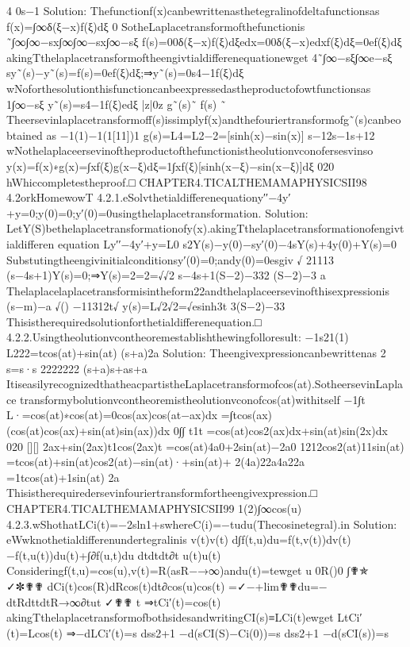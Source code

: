 {4
0s−1
Solution:
Thefunctionf(x)canbewrittenasthetegralinofdeltafunctionsas
f(x)=∫∞δ(ξ−x)f(ξ)dξ
0
SotheLaplacetransformofthefunctionis
˜∫∞{∫∞}−sx∫∞{∫∞−sx}∫∞−sξ
f(s)=00δ(ξ−x)f(ξ)dξedx=00δ(ξ−x)edxf(ξ)dξ=0ef(ξ)dξ
akingTthelaplacetransformoftheengivtialdifferenequationewget
4˜∫∞−sξ∫∞e−sξ
sy˜(s)−y˜(s)=f(s)=0ef(ξ)dξ;⇒y˜(s)=0s4−1f(ξ)dξ
wNoforthesolutionthisfunctioncanbeexpressedastheproductofowtfunctionsas
1∫∞−sξ
y˜(s)=s4−1f(ξ)edξ
|{z}|0{z}
g˜(s)˜
f(s)
˜
Theersevinlaplacetransformoff(s)issimplyf(x)andthefouriertransformofg˜(s)canbeobtained
as
−1(1)−1(1[11])1
g(s)=L4=L2−2=[sinh(x)−sin(x)]
s−12s−1s+12
wNothelaplaceersevinoftheproductofthefunctionistheolutionvconofersesvinso
y(x)=f(x)∗g(x)=∫xf(ξ)g(x−ξ)dξ=1∫xf(ξ)[sinh(x−ξ)−sin(x−ξ)]dξ
020
hWhiccompletestheproof.□
CHAPTER4.TICALTHEMAMAPHYSICSII98
4.2orkHomewowT
4.2.1.eSolvthetialdifferenequationy′′−4y′+y=0;y(0)=0;y′(0)=0usingthelaplacetransformation.
Solution:
LetY(S)bethelaplacetransformationofy(x).akingTthelaplacetransformationofengivtialdifferen
equation
L{y′′−4y′+y}=L{0}
s2Y(s)−y(0)−sy′(0)−4sY(s)+4y(0)+Y(s)=0
Substutingtheengivinitialconditionsy′(0)=0;andy(0)=0esgiv
√
21113
(s−4s+1)Y(s)=0;⇒Y(s)=2=2=√√2
s−4s+1(S−2)−332
(S−2)−3
a
Thelaplacelaplacetransformisintheform22andthelaplaceersevinofthisexpressionis
(s−m)−a
{√}()
−11312t√
y(s)=L√2√2=√esinh3t
3(S−2)−33
Thisistherequiredsolutionforthetialdifferenequation.□
4.2.2.Usingtheolutionvcontheoremestablishthewingfolloresult:
−1{s2}1(1)
L222=tcos(at)+sin(at)
(s+a)2a
Solution:
Theengivexpressioncanbewrittenas
2
s=s·s
2222222
(s+a)s+as+a
ItiseasilyrecognizedthatheacpartistheLaplacetransformofcos(at).SotheersevinLaplace
transformybolutionvcontheoremistheolutionvconofcos(at)withitself
−1∫t
L{·}=cos(at)∗cos(at)=0cos(ax)cos(at−ax)dx
=∫tcos(ax)(cos(at)cos(ax)+sin(at)sin(ax))dx
0∫∫
t1t
=cos(at)cos2(ax)dx+sin(at)sin(2x)dx
020
[][]
2ax+sin(2ax)t1cos(2ax)t
=cos(at)4a0+2sin(at)−2a0
1212cos2(at)11sin(at)
=tcos(at)+sin(at)cos2(at)−sin(at)·+sin(at)+
2(4a)22a4a22a
=1tcos(at)+1sin(at)
2a
Thisistherequiredersevinfouriertransformfortheengivexpression.□
CHAPTER4.TICALTHEMAMAPHYSICSII99
1(2)∫∞cos(u)
4.2.3.wShothatL{Ci(t)}=−2sln1+swhereC(i)=−tudu(Thecosinetegral).in
Solution:
eWwknothetialdifferenundertegralinis
v(t)v(t)
d∫f(t,u)du=f(t,v(t))dv(t)−f(t,u(t))du(t)+∫∂f(u,t)du
dtdtdt∂t
u(t)u(t)
Consideringf(t,u)=cos(u),v(t)=R(asR−→∞)andu(t)=tewget
u
0R()0
∫✟✯
✓✼✟✟
dCi(t)cos(R)dRcos(t)dt∂cos(u)cos(t)
=✓−+lim✟✟du=−
dtRdttdtR→∞∂tut
✓✟✟
t
⇒tCi′(t)=cos(t)
akingTthelaplacetransformofbothsidesandwritingCI(s)≡L{Ci(t)}ewget
L{tCi′(t)}=L{cos(t)}
⇒−dL{Ci′(t)}=s
dss2+1
−d(sCI(S)−Ci(0))=s
dss2+1
−d(sCI(s))=s
}
